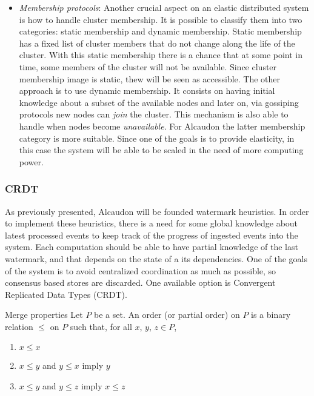 \begin{itemize}
\item \textit{Membership protocols}: Another crucial aspect on an elastic
  distributed system is how to handle cluster membership. It is possible to
  classify them into two categories: static membership and dynamic membership.
  Static membership has a fixed list of cluster members that do not change along
  the life of the cluster. With this static membership there is a chance that at
  some point in time, some members of the cluster will not be available. Since
  cluster membership image is static, thew will be seen as accessible. The other
  approach is to use dynamic membership. It consists on having initial knowledge
  about a subset of the available nodes and later on, via gossiping
  protocols\cite{gossip} new nodes can \textit{join} the cluster. This mechanism
  is also able to handle when nodes become \textit{unavailable}. For Alcaudon
  the latter membership category is more suitable. Since one of the goals is to
  provide elasticity, in this case the system will be able to be scaled in the
  need of more computing power.
\end{itemize}

\subsubsection{CRDT}

As previously presented, Alcaudon will be founded watermark heuristics. In order
to implement these heuristics, there is a need for some global knowledge about
latest processed events to keep track of the progress of ingested events into
the system. Each computation should be able to have partial knowledge of the
last watermark, and that depends on the state of a its dependencies. One of the
goals of the system is to avoid centralized coordination as much as possible, so
consensus based stores are discarded. One available option is Convergent
Replicated Data Types (CRDT)\cite{crdt}.


\begin{definition}{Merge properties}
  Let $P$ be a set. An order (or partial order) on $P$ is a binary relation
  $\leq$ on $P$ such that, for all $x$, $y$, $z \in P$,
  \begin{enumerate}
  \item $x \leq x$
  \item $x \leq y$ and $y \leq x$ imply $y$
  \item $x \leq y$ and $y \leq z$ imply $x \leq z$
  \end{enumerate}
\end{definition}

